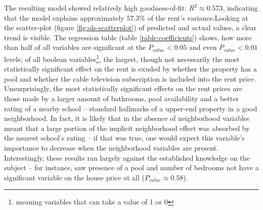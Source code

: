 \documentclass[12pt]{report}
\begin{document}
The resulting model showed relatively high goodness-of-fit: $R^2\approx0.573$, indicating that the model explains approximately $57.3\%$ of the rent's variance.Looking at the scatter-plot (figure \ref{fig:ols-scatterplot}) of predicted and actual values, a clear trend is visible. The regression table (table \ref{table:coefficients}) shows, how more than half of all variables are significant at the $P_{value}<0.05$ and even $P_{value}<0.01$ levels; of all boolean variables\footnote{meaning variables that can take a value of 1 or 0}, the largest, though not necessarily the most statistically significant effect on the rent is exuded by whether the property has a pool and whether the cable television subscription is included into the rent price. Unsurprisingly, the most statistically significant effects on the rent prices are those made by a larger amount of bathrooms, pool availability and a better rating of a nearby school -- standard hallmarks of a upper-end property in a good neighborhood. In fact, it is likely that in the absence of neighborhood variables meant that a large portion of the implicit neighborhood effect was absorbed by the nearest school's rating -- if that was true, one would expect this variable's importance to decrease when the neighborhood variables are present. Interestingly, these results ran largely against the established knowledge on the subject -- for instance, \cite{zietz2008} saw presence of a pool and number of bedrooms not have a significant variable on the house price at all ($P_{value}\approx 0.58$).
\end{document}
